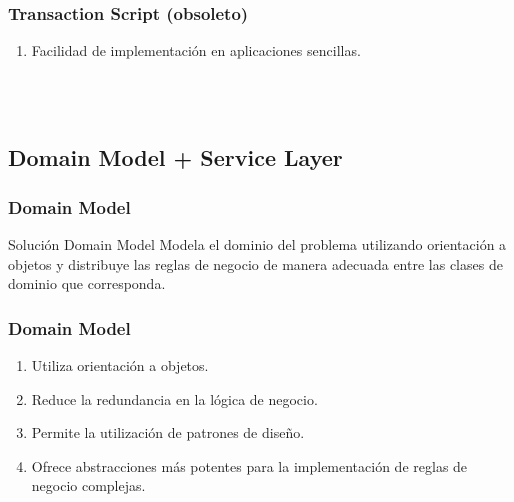 \documentclass[handout,a4paper,slidestop,xcolor=pst,blue]{beamer}
\begin{document}
\begin{frame}[c]
    \frametitle{Transaction Script (obsoleto)}
    \begin{enumerate}
        \item<2-> Facilidad de implementación en aplicaciones sencillas.
    \end{enumerate}
    \ \\ \ \\
\end{frame}

\subsection{Domain Model + Service Layer}

\begin{frame}[c]
    \frametitle{Domain Model}
    \begin{block}{Solución Domain Model}
        Modela el dominio del problema utilizando orientación a objetos y distribuye las reglas de negocio de manera adecuada entre las clases de dominio que corresponda.
    \end{block}
\end{frame}

\begin{frame}[c]
    \frametitle{Domain Model}
    \begin{enumerate}
        \item<2-> Utiliza orientación a objetos.
        \item<3-> Reduce la redundancia en la lógica de negocio.
        \item<4-> Permite la utilización de patrones de diseño.
        \item<5-> Ofrece abstracciones más potentes para la implementación de reglas  de negocio complejas.
    \end{enumerate}
    \ \\ \ \\
\end{frame}
\end{document}
